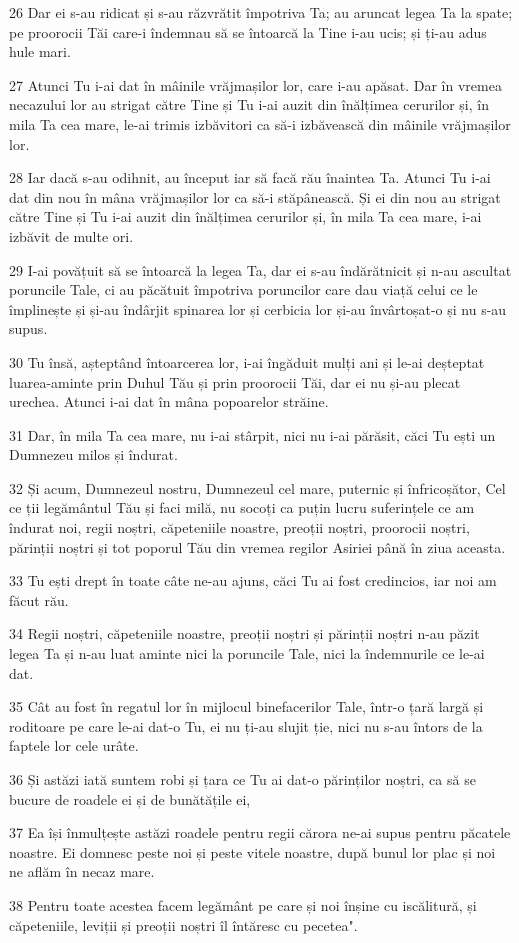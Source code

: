 \par 26 Dar ei s-au ridicat și s-au răzvrătit împotriva Ta; au aruncat legea Ta la spate; pe proorocii Tăi care-i îndemnau să se întoarcă la Tine i-au ucis; și ți-au adus hule mari.
\par 27 Atunci Tu i-ai dat în mâinile vrăjmașilor lor, care i-au apăsat. Dar în vremea necazului lor au strigat către Tine și Tu i-ai auzit din înălțimea cerurilor și, în mila Ta cea mare, le-ai trimis izbăvitori ca să-i izbăvească din mâinile vrăjmașilor lor.
\par 28 Iar dacă s-au odihnit, au început iar să facă rău înaintea Ta. Atunci Tu i-ai dat din nou în mâna vrăjmașilor lor ca să-i stăpânească. Și ei din nou au strigat către Tine și Tu i-ai auzit din înălțimea cerurilor și, în mila Ta cea mare, i-ai izbăvit de multe ori.
\par 29 I-ai povățuit să se întoarcă la legea Ta, dar ei s-au îndărătnicit și n-au ascultat poruncile Tale, ci au păcătuit împotriva poruncilor care dau viață celui ce le împlinește și și-au îndârjit spinarea lor și cerbicia lor și-au învârtoșat-o și nu s-au supus.
\par 30 Tu însă, așteptând întoarcerea lor, i-ai îngăduit mulți ani și le-ai deșteptat luarea-aminte prin Duhul Tău și prin proorocii Tăi, dar ei nu și-au plecat urechea. Atunci i-ai dat în mâna popoarelor străine.
\par 31 Dar, în mila Ta cea mare, nu i-ai stârpit, nici nu i-ai părăsit, căci Tu ești un Dumnezeu milos și îndurat.
\par 32 Și acum, Dumnezeul nostru, Dumnezeul cel mare, puternic și înfricoșător, Cel ce ții legământul Tău și faci milă, nu socoți ca puțin lucru suferințele ce am îndurat noi, regii noștri, căpeteniile noastre, preoții noștri, proorocii noștri, părinții noștri și tot poporul Tău din vremea regilor Asiriei până în ziua aceasta.
\par 33 Tu ești drept în toate câte ne-au ajuns, căci Tu ai fost credincios, iar noi am făcut rău.
\par 34 Regii noștri, căpeteniile noastre, preoții noștri și părinții noștri n-au păzit legea Ta și n-au luat aminte nici la poruncile Tale, nici la îndemnurile ce le-ai dat.
\par 35 Cât au fost în regatul lor în mijlocul binefacerilor Tale, într-o țară largă și roditoare pe care le-ai dat-o Tu, ei nu ți-au slujit ție, nici nu s-au întors de la faptele lor cele urâte.
\par 36 Și astăzi iată suntem robi și țara ce Tu ai dat-o părinților noștri, ca să se bucure de roadele ei și de bunătățile ei,
\par 37 Ea își înmulțește astăzi roadele pentru regii cărora ne-ai supus pentru păcatele noastre. Ei domnesc peste noi și peste vitele noastre, după bunul lor plac și noi ne aflăm în necaz mare.
\par 38 Pentru toate acestea facem legământ pe care și noi înșine cu iscălitură, și căpeteniile, leviții și preoții noștri îl întăresc cu pecetea".


